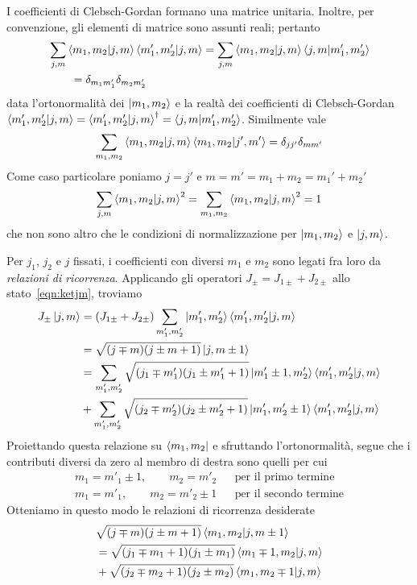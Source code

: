 I coefficienti di Clebsch-Gordan formano una matrice unitaria. Inoltre, per convenzione, gli elementi di matrice sono assunti reali; pertanto
\begin{equation}\begin{split}
&\sum_{j,m}{\braket{m_1,m_2|j,m}\braket{m_1',m_2'|j,m}}=\sum_{j,m}{\braket{m_1,m_2|j,m}\braket{j,m|m_1',m_2'}}\\
&\qquad=\delta_{m_1m'_1}\delta_{m_2m'_2}
\end{split}\end{equation}
data l'ortonormalità dei ${\ket{m_1,m_2}}$ e la realtà dei coefficienti di Clebsch-Gordan $\braket{m_1',m_2'|j,m}=\braket{m_1',m_2'|j,m}^\dagger=\braket{j,m|m_1',m_2'}$. Similmente vale
\begin{equation}
\sum_{m_1,m_2}{\braket{m_1,m_2|j,m}\braket{m_1,m_2|j',m'}=\delta_{jj'}\delta_{mm'}}
\end{equation}
Come caso particolare poniamo $j=j'$ e $m=m'=m_1+m_2=m_1'+m_2'$
\begin{equation}
\sum_{j,m}{\braket{m_1,m_2|j,m}^2}=\sum_{m_1,m_2}{\braket{m_1,m_2|j,m}^2}=1
\end{equation}
che non sono altro che le condizioni di normalizzazione per $\ket{m_1,m_2}$ e $\ket{j,m}$.

Per $j_1$, $j_2$ e $j$ fissati, i coefficienti con diversi $m_1$ e $m_2$ sono legati fra loro da \textit{relazioni di ricorrenza}. Applicando gli operatori $J_\pm=J_{1\pm}+J_{2\pm}$ allo stato~\eqref{eqn:ketjm}, troviamo
\begin{equation}\begin{split}
J_\pm\ket{j,m}&=(J_{1\pm}+J_{2\pm})\sum_{m'_1,m'_2}\ket{m'_1,m'_2}\braket{m'_1,m'_2|j,m} \\
&=\sqrt{(j\mp m)(j\pm m+1)}\ket{j,m\pm 1} \\
&=\sum_{m'_1,m'_2}{\sqrt{(j_1 \mp m'_1)(j_1 \pm m'_1+1)}\ket{m'_1\pm 1,m'_2}\braket{m'_1,m'_2|j,m}} \\
&+\sum_{m'_1,m'_2}{\sqrt{(j_2 \mp m'_2)(j_2 \pm m'_2+1)}\ket{m'_1,m'_2\pm 1}\braket{m'_1,m'_2|j,m}}
\end{split}\end{equation}
Proiettando questa relazione su $\bra{m_1,m_2}$ e sfruttando l'ortonormalità, segue che i contributi diversi da zero al membro di destra sono quelli per cui
\begin{align}
m_1=m'_1\pm 1, \qquad m_2=m'_2 && \text{per il primo termine} \\
m_1=m'_1, \qquad m_2=m'_2\pm 1 && \text{per il secondo termine}
\end{align}
Otteniamo in questo modo le relazioni di ricorrenza desiderate
\begin{equation} \begin{split}
&\sqrt{(j \mp m)(j \pm m + 1)}\braket{m_1,m_2|j,m\pm1} \\
&= \sqrt{(j_1 \mp m_1+1)(j_1 \pm m_1)}\braket{m_1 \mp 1, m_2|j,m} \\
&+ \sqrt{(j_2 \mp m_2+1)(j_2 \pm m_2)}\braket{m_1, m_2 \mp 1|j,m}
\end{split} \end{equation}

